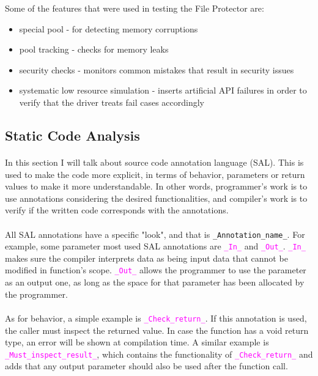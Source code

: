 		\newpage
		Some of the features that were used in testing the File Protector are:
		\begin{itemize}
			\item special pool - for detecting memory corruptions
			\item pool tracking - checks for memory leaks
			\item security checks - monitors common mistakes that result in security issues
			\item systematic low resource simulation - inserts artificial API failures in order to verify that the driver treats fail cases accordingly
		\end{itemize}
		
		\subsection{Static Code Analysis}
		\paragraph{}
		In this section I will talk about source code annotation language (SAL). This is used to make the code more explicit, in terms of behavior, parameters or return values to make it more understandable. In other words, programmer's work is to use annotations considering the desired functionalities, and compiler's work is to verify if the written code corresponds with the annotations. 
		
		\paragraph{}
		All SAL annotations have a specific "look", and that is \texttt{\_Annotation\_name\_}. For example, some parameter most used SAL annotations are \textcolor{magenta}{\texttt{\_In\_}} and \textcolor{magenta}{\texttt{\_Out\_}}. \textcolor{magenta}{\texttt{\_In\_}} makes sure the compiler interprets data as being input data that cannot be modified in function's scope. \textcolor{magenta}{\texttt{\_Out\_}} allows the programmer to use the parameter as an output one, as long as the space for that parameter has been allocated by the programmer.
		
		\paragraph{}
		As for behavior, a simple example is \textcolor{magenta}{\texttt{\_Check\_return\_}}. If this annotation is used, the caller must inspect the returned value. In case the function has a void return type, an error will be shown at compilation time. A similar example is \textcolor{magenta}{\texttt{\_Must\_inspect\_result\_}}, which contains the functionality of \textcolor{magenta}{\texttt{\_Check\_return\_}} and adds that any output parameter should also be used after the function call.
		
